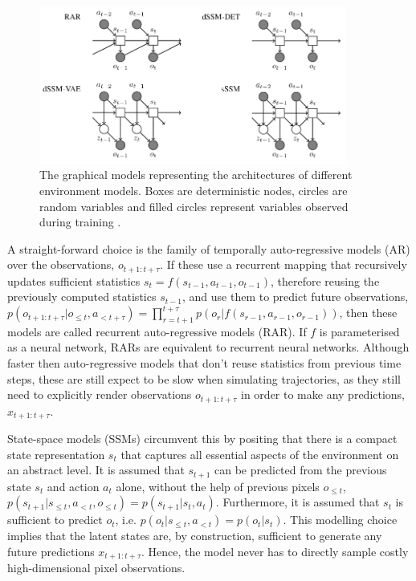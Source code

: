 \begin{figure}[H]
\includegraphics[width=0.9\textwidth,keepaspectratio]{figures/FastGenerativeModels.png}
\caption[Fast Generative Models]{The graphical models representing the architectures of different environment models. Boxes are deterministic nodes, circles are random variables and filled circles represent variables observed during training \protect\cite{Algo.FastGenerativeModels}.}
\label{Fig.FastGenerativeModels}
\end{figure}

A straight-forward choice is the family of temporally auto-regressive models (AR) over the observations, $o_{t+1:t+\tau}$. If these use a recurrent mapping that recursively updates sufficient statistics $s_t = f(s_{t−1}, a_{t−1}, o_{t−1})$, therefore reusing the previously computed statistics $s_{t-1}$, and use them to predict future observations, $p(o_{t+1:t+\tau} | o_{\leqslant t}, a_{<t+\tau}) = \prod^{t+\tau}_{r=t+1} p(o_r | f(s_{r−1}, a_{r−1}, o_{r−1}))$, then these models are called recurrent auto-regressive models (RAR). If $f$ is parameterised as a neural network, RARs are equivalent to recurrent neural networks. Although faster then auto-regressive models that don't reuse statistics from previous time steps, these are still expect to be slow when simulating trajectories, as they still need to explicitly render observations $o_{t+1:t+\tau}$ in order to make any predictions, $x_{t+1:t+\tau}$.

State-space models (SSMs) circumvent this by positing that there is a compact state representation $s_t$ that captures all essential aspects of the environment on an abstract level. It is assumed that $s_{t+1}$ can be predicted from the previous state $s_t$ and action $a_t$ alone, without the help of previous pixels $o_{\leqslant t}$, $p(s_{t+1}|s_{\leqslant t}, a_{<t}, o_{\leqslant t}) = p(s_{t+1}| s_t, a_t)$. Furthermore, it is assumed that $s_t$ is sufficient to predict $o_t$, i.e. $p(o_t|s_{\leqslant t}, a_{<t}) = p(o_t|s_t)$. This modelling choice implies that the latent states are, by construction, sufficient to generate any future predictions $x_{t+1:t+\tau}$. Hence, the model never has to directly sample costly high-dimensional pixel observations.

